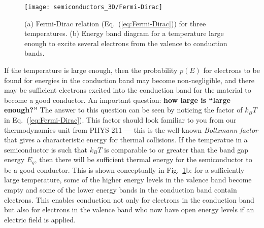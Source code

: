\begin{figure}
\begin{center}
\texttt{[image: semiconductors\_3D/Fermi-Dirac]}
\end{center} 
\caption{(a) Fermi-Dirac relation (Eq.~(\ref{eq:Fermi-Dirac})) for
three temperatures. (b) Energy band diagram for a temperature large
enough to excite several electrons from the valence to conduction bands.} 
\label{fig:Fermi-Dirac} 
\end{figure}

If the temperature is large enough, then the probability $p(E)$ for electrons
to be found for energies in the conduction band 
may become non-negligible, and there may be sufficient electrons
excited into the conduction band for the material to become a good conductor.
An important question:  {\bf how large is ``large enough?''} The answer
to this question can be seen by noticing the factor of $k_BT$
in Eq.~(\ref{eq:Fermi-Dirac}). This factor should look familiar to you
from our thermodynamics unit from PHYS 211 --- this is the well-known
{\it Boltzmann factor} that gives a characteristic energy for thermal
collisions.  If the temperatue in a semiconductor is such that $k_BT$ is
comparable to or greater than the band gap energy $E_g$, then there will
be sufficient thermal energy for the semiconductor to be a 
good conductor. This is shown conceptually in Fig.~\ref{fig:Fermi-Dirac}b: for 
a sufficiently large temperature, some of the higher energy levels in the
valence band become empty and some of the lower energy bands in the conduction
band contain electrons. This enables conduction not only for electrons
in the conduction band but also for electrons in the valence band who now
have open energy levels if an electric field is applied.

